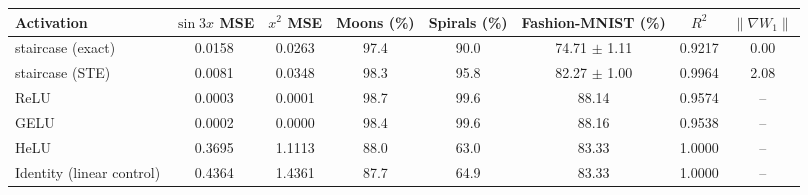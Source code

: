 \begin{tabular}{lccccccc}
\toprule
Activation & $\sin 3x$ MSE & $x^2$ MSE & Moons (\%) & Spirals (\%) & Fashion-MNIST (\%) & $R^2$ & $\|\nabla W_1\|$ \\
\midrule
staircase (exact) & 0.0158 & 0.0263 & 97.4 & 90.0 & 74.71 $\pm$ 1.11 & 0.9217 & 0.00 \\
staircase (STE) & 0.0081 & 0.0348 & 98.3 & 95.8 & 82.27 $\pm$ 1.00 & 0.9964 & 2.08 \\
\midrule
ReLU & 0.0003 & 0.0001 & 98.7 & 99.6 & 88.14 & 0.9574 & -- \\
GELU & 0.0002 & 0.0000 & 98.4 & 99.6 & 88.16 & 0.9538 & -- \\
HeLU & 0.3695 & 1.1113 & 88.0 & 63.0 & 83.33 & 1.0000 & -- \\
Identity (linear control) & 0.4364 & 1.4361 & 87.7 & 64.9 & 83.33 & 1.0000 & -- \\
\bottomrule
\end{tabular}
